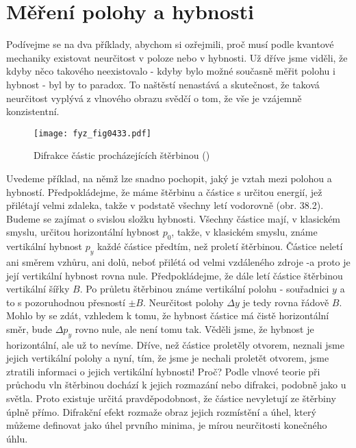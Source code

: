   \section{Měření polohy a hybnosti}\label{fyz:IchapXXXVIIIsecII}
    Podívejme se na dva příklady, abychom si ozřejmili, proč musí podle kvantové mechaniky existovat
    neurčitost v poloze nebo v hybnosti. Už dříve jsme viděli, že kdyby něco takového neexistovalo -
    kdyby bylo možné současně měřit polohu i hybnost - byl by to paradox. To naštěstí nenastává a
    skutečnost, že taková neurčitost vyplývá z vlnového obrazu svědčí o tom, že vše je vzájemně
    konzistentní.

    \begin{figure}[ht!] %
      \centering
      \texttt{[image: fyz\_fig0433.pdf]}
      \caption{Difrakce částic procházejících štěrbinou (\cite[s.~511]{Feynman01})}
      \label{fyz:fig0433}
    \end{figure}

    Uvedeme příklad, na němž lze snadno pochopit, jaký je vztah mezi polohou a hybností.
    Předpokládejme, že máme štěrbinu a částice s určitou energií, jež přilétají velmi zdaleka, takže
    v podstatě všechny letí vodorovně (obr. 38.2). Budeme se zajímat o svislou složku hybnosti.
    Všechny částice mají, v klasickém smyslu, určitou horizontální hybnost \(p_0\), takže, v
    klasickém smyslu, známe vertikální hybnost \(p_y\) každé částice předtím, než proletí štěrbinou.
    Částice neletí ani směrem vzhůru, ani dolů, neboť přilétá od velmi vzdáleného zdroje -a proto je
    její vertikální hybnost rovna nule. Předpokládejme, že dále letí částice štěrbinou vertikální
    šířky \(B\). Po průletu štěrbinou známe vertikální polohu - souřadnici \(y\) a to s pozoruhodnou
    přesností \(\pm B\). Neurčitost polohy \(\Delta y\) je tedy rovna řádově \(B\). Mohlo by se
    zdát, vzhledem k tomu, že hybnost částice má čistě horizontální směr, bude \(\Delta p_y\) rovno
    nule, ale není tomu tak. Věděli jsme, že hybnost je horizontální, ale už to nevíme. Dříve, než
    částice proletěly otvorem, neznali jsme jejich vertikální polohy a nyní, tím, že jsme je nechali
    proletět otvorem, jsme ztratili informaci o jejich vertikální hybnosti! Proč? Podle vlnové
    teorie při průchodu vln štěrbinou dochází k jejich rozmazání nebo difrakci, podobně jako u
    světla. Proto existuje určitá pravděpodobnost, že částice nevyletují ze štěrbiny úplně přímo.
    Difrakční efekt rozmaže obraz jejich rozmístění a úhel, který můžeme definovat jako úhel prvního
    minima, je mírou neurčitosti konečného úhlu.


